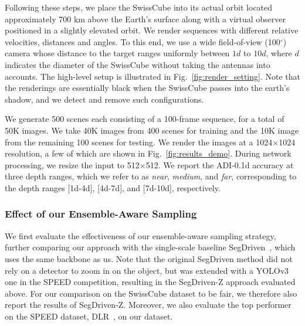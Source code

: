 Following these steps, we place the SwissCube into its actual orbit located
approximately 700 km above the Earth's surface along with a virtual observer
positioned in a slightly elevated orbit. We render sequences with different
relative velocities, distances and angles. To this end, we use a wide field-of-view (100$^{\circ}$) camera whose distance to the target ranges uniformly between $1d$ to $10d$, where $d$ indicates the diameter of the SwissCube without taking the antennas into accounts.
The high-level
setup is illustrated in Fig.~\ref{fig:render_setting}. Note that the renderings
are essentially black when the SwissCube passes into the earth's shadow, and we
detect and remove such configurations.

We generate 500 scenes each consisting of a 100-frame sequence, for a total of
50K images. We take 40K images from 400 scenes for training and the 10K
image from the remaining 100 scenes for testing. 
We render the images at a 1024$\times$1024
resolution, a few of which are shown in Fig.~\ref{fig:results_demo}. During network processing, we resize the
input to 512$\times$512. 
We report the ADI-0.1d accuracy at three
depth ranges, which we refer to as {\it near}, {\it medium}, and {\it far}, corresponding to the depth ranges [1d-4d],
[4d-7d], and [7d-10d], respectively.



\subsubsection{Effect of our Ensemble-Aware Sampling}
We first evaluate the effectiveness of our ensemble-aware sampling strategy, further comparing our approach with the single-scale baseline SegDriven~\cite{Hu19a}, which uses the same backbone as us. Note that the original SegDriven method did not rely on a detector to zoom in on the object, but was extended with a YOLOv3~\cite{Redmon18} one in the SPEED competition, resulting in the SegDriven-Z approach evaluated above. For our comparison on the SwissCube dataset to be fair, we therefore also report the results of SegDriven-Z.
Moreover, we also evaluate the top performer on the SPEED dataset, DLR~\cite{Chen19DLR}, on our dataset.

